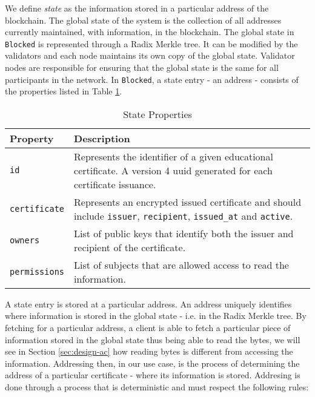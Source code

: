 We define \textit{state} as the information stored in a particular address of the blockchain. The global state of the system is the collection of all addresses currently maintained, with information, in the blockchain. The global state in \texttt{Blocked} is represented through a Radix Merkle tree. It can be modified by the validators and each node maintains its own copy of the global state. Validator nodes are responsible for ensuring that the global state is the same for all participants in the network. In \texttt{Blocked}, a state entry - an address - consists of the properties listed in Table \ref{tab:stateProperties}.

{
\renewcommand{\arraystretch}{1.5}%
\begin{table}[htb]
	\centering
	\caption{State Properties}
	\label{tab:stateProperties}
	\begin{tabular}{p{}|p{}}
		\hline \bf Property  & \bf Description                                                                                                                             \\ \hline
		\texttt{id}          & Represents the identifier of a given educational certificate. A version 4 \gls{uuid} generated for each certificate issuance.               \\ \hline
		\texttt{certificate} & Represents an encrypted issued certificate and should include \texttt{issuer}, \texttt{recipient}, \texttt{issued\_at} and \texttt{active}. \\ \hline
		\texttt{owners}      & List of public keys that identify both the issuer and recipient of the certificate.                                                         \\ \hline
		\texttt{permissions} & List of subjects that are allowed access to read the information.                                                                           \\
		\hline
	\end{tabular}
\end{table}
}

A state entry is stored at a particular address. An address uniquely identifies where information is stored in the global state - i.e. in the Radix Merkle tree. By fetching for a particular address, a client is able to fetch a particular piece of information stored in the global state thus being able to read the bytes, we will see in Section \ref{sec:design-ac} how reading bytes is different from accessing the information. Addressing then, in our use case, is the process of determining the address of a particular certificate - where its information is stored. Addresing is done through a process that is deterministic and must respect the following rules:

